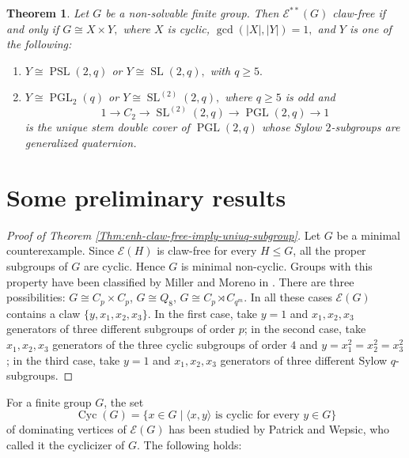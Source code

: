 \documentclass[preprint,11pt]{elsarticle}
\newcommand{\cyc}{\operatorname{Cyc}}
\newtheorem{theorem}{\bf Theorem}[section]
\begin{document}
\begin{theorem}\label{nonsolvable}
	\label{thm:central-extensions-PSL-PGL}
	Let $G$ be a non-solvable finite group. Then $\mathcal E^{**}(G)$ claw-free if and only if $G\cong X\times Y,$ 
	where $X$ is cyclic, 
	$\gcd(|X|,|Y|)=1,$ and $Y$ is one of the following:
	\begin{enumerate}
		\item 
	$
		Y\cong\operatorname{PSL}(2,q)$ or
		$		Y\cong\operatorname{SL}(2,q), 
		$ with $q\geq 5.$
		
		\item
		$
		Y\cong\operatorname{PGL}_2(q)
		$
		or
		$
		Y\cong
		\operatorname{SL}^{(2)}(2,q),
		$
		where $q\geq 5$ is odd and
		\[
		1\longrightarrow C_2
		\longrightarrow
		\operatorname{SL}^{(2)}(2,q)
		\longrightarrow
		\operatorname{PGL}(2,q)
		\longrightarrow1
		\]
		is the unique stem double cover of
		$\operatorname{PGL}(2,q)$ whose Sylow $2$-subgroups are
		generalized quaternion.
	\end{enumerate}
\end{theorem}




\section{Some preliminary results}\label{preliminar}
\begin{proof}[Proof of Theorem \ref{Thm:enh-claw-free-imply-uniuq-subgroup}]
Let $G$ be a minimal counterexample. Since $\mathcal{E}(H)$ is claw-free for every 
$H\leq G$, all the proper subgroups of $G$ are cyclic. Hence $G$ is minimal non-cyclic. 
Groups with this property have been classified by Miller and Moreno in \cite{miller_moreno}. There are three 
possibilities: $G\cong C_p\times C_p$, $G\cong Q_8$, $G\cong C_p\rtimes C_{q^m}$. 
In all these cases $\mathcal{E}(G)$ contains a claw $\{y, x_1, x_2, x_3\}$. In the 
first case, take $y=1$ and $x_1, x_2, x_3$ generators of three different subgroups of 
order $p$; in the second case, take $x_1, x_2, x_3$ generators of the three cyclic 
subgroups of order $4$ and $y=x_1^2=x_2^2=x_3^2$; in the third case, take $y=1$ and 
$x_1, x_2, x_3$ generators of three different Sylow $q$-subgroups.
\end{proof}

For a finite group $G$, the set $$\cyc(G)=\{x\in G\mid \langle x, y\rangle \text{ is cyclic for every $y\in G$}\}$$ of dominating vertices of $\mathcal E(G)$ has been studied by Patrick and
Wepsic, who called it the cyclicizer of $G$. The following holds:
\end{document}
